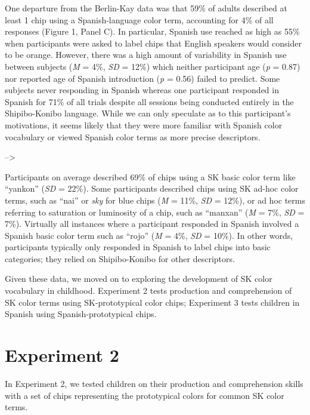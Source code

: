 \documentclass[,man,floatsintext]{apa6}
\theoremstyle{definition}
\theoremstyle{definition}
\theoremstyle{definition}
\theoremstyle{remark}
\begin{document}
One departure from the Berlin-Kay data was that 59\% of adults described
at least 1 chip using a Spanish-language color term, accounting for 4\%
of all responses (Figure 1, Panel C). In particular, Spanish use reached
as high as 55\% when participants were asked to label chips that English
speakers would consider to be orange. However, there was a high amount
of variability in Spanish use between subjects (\emph{M} = 4\%,
\emph{SD} = 12\%) which neither participant age (\emph{p} = 0.87) nor
reported age of Spanish introduction (\emph{p} = 0.56) failed to
predict. Some subjects never responding in Spanish whereas one
participant responded in Spanish for 71\% of all trials despite all
sessions being conducted entirely in the Shipibo-Konibo language. While
we can only speculate as to this participant's motivations, it seems
likely that they were more familiar with Spanish color vocabulary or
viewed Spanish color terms as more precise descriptors.

\hypertarget{htmlwidget-eaef49d4a484bc22a8b4}{}

--\textgreater{}

Participants on average described 69\% of chips using a SK basic color
term like \enquote{yankon} (\emph{SD} = 22\%). Some participants
described chips using SK ad-hoc color terms, such as \enquote{nai} or
\emph{sky} for blue chips (\emph{M} = 11\%, \emph{SD} = 12\%), or ad hoc
terms referring to saturation or luminosity of a chip, such as
\enquote{manxan} (\emph{M} = 7\%, \emph{SD} = 7\%). Virtually all
instances where a participant responded in Spanish involved a Spanish
basic color term such as \enquote{rojo} (\emph{M} = 4\%, \emph{SD} =
10\%). In other words, participants typically only responded in Spanish
to label chips into basic categories; they relied on Shipibo-Konibo for
other descriptors.

Given these data, we moved on to exploring the development of SK color
vocabulary in childhood. Experiment 2 tests production and comprehension
of SK color terms using SK-prototypical color chips; Experiment 3 tests
children in Spanish using Spanish-prototypical chips.

\section{Experiment 2}\label{experiment-2}

In Experiment 2, we tested children on their production and
comprehension skills with a set of chips representing the prototypical
colors for common SK color terms.
\end{document}
